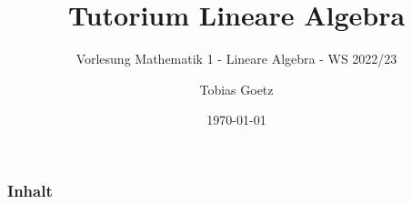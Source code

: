 \documentclass[11pt]{beamer}
\title[Tutorium Lineare Algebra]{Tutorium Lineare Algebra}
\subtitle{Vorlesung Mathematik 1 - Lineare Algebra - WS 2022/23}
\author{Tobias Goetz}
\institute{DHBW Ravensburg}
\date{\today}
\begin{document}
    \begin{frame}
        \titlepage
    \end{frame}

    \begin{frame}
        \frametitle{Inhalt}
        \tableofcontents
    \end{frame}

    
    
    
    
\end{document}
